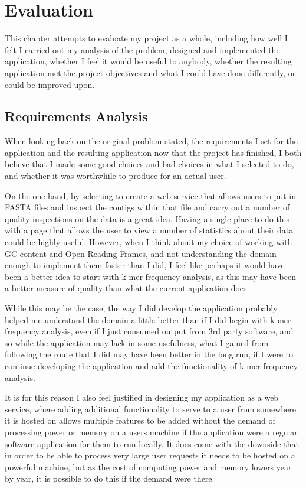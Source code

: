 \chapter{Evaluation}
This chapter attempts to evaluate my project as a whole, including how well I felt I carried out my analysis of the problem, designed and implemented the application, whether I feel it would be useful to anybody, whether the resulting application met the project objectives and what I could have done differently, or could be improved upon.

\section{Requirements Analysis}
When looking back on the original problem stated, the requirements I set for the application and the resulting application now that the project has finished, I both believe that I made some good choices and bad choices in what I selected to do, and whether it was worthwhile to produce for an actual user.

On the one hand, by selecting to create a web service that allows users to put in FASTA files and inspect the contigs within that file and carry out a number of quality inspections on the data is a great idea. Having a single place to do this with a page that allows the user to view a number of statistics about their data could be highly useful. However, when I think about my choice of working with GC content and Open Reading Frames, and not understanding the domain enough to implement them faster than I did, I feel like perhaps it would have been a better idea to start with k-mer frequency analysis, as this may have been a better measure of quality than what the current application does.

While this may be the case, the way I did develop the application probably helped me understand the domain a little better than if I did begin with k-mer frequency analysis, even if I just consumed output from 3rd party software, and so while the application may lack in some usefulness, what I gained from following the route that I did may have been better in the long run, if I were to continue developing the application and add the functionality of k-mer frequency analysis.

It is for this reason I also feel justified in designing my application as a web service, where adding additional functionality to serve to a user from somewhere it is hosted on allows multiple features to be added without the demand of processing power or memory on a users machine if the application were a regular software application for them to run locally. It does come with the downside that in order to be able to process very large user requests it needs to be hosted on a powerful machine, but as the cost of computing power and memory lowers year by year, it is possible to do this if the demand were there.

